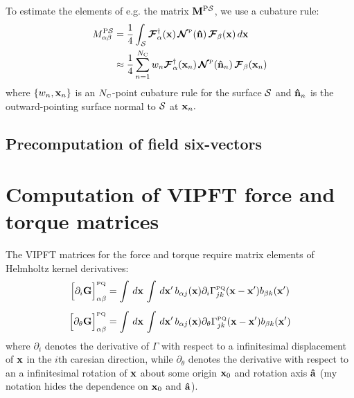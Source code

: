 \documentclass[letterpaper]{article}
\newcommand{\PS}{^{\text{\scriptsize P}\mc S}}
\begin{document}
To estimate the elements of e.g. the matrix $\vb M\PS$, we
use a cubature rule:
\begin{align}
  M_{\alpha\beta}\PS
 &= \frac{1}{4} \int_{\mc S} 
    \bmc F^\dagger_\alpha(\vb x) 
    \,
    \bmc N\supt{P}(\vbhat{n})
    \,
    \bmc F_\beta(\vb x) 
     \, d\vb x
\nn
 &\approx \frac{1}{4} \sum_{n=1}^{N\subt{C}} w_n 
    \bmc F^\dagger_\alpha(\vb x_n) 
    \,
    \bmc N\supt{P}(\vbhat{n}_n)
    \,
    \bmc F_\beta(\vb x_n) 
\label{MPSCubature}
\end{align}
where $\{w_n, \mathbf{x}_n\}$ is an $N_{\hbox{\tiny{C}}}$-point cubature rule 
for the surface $\mathcal{S}$ and $\mathbf{\hat n}_n$ is the outward-pointing
surface normal to $\mathcal{S}$ at $\mathbf{x}_n.$
 
\subsection{Precomputation of field six-vectors}

\section{Computation of VIPFT force and torque matrices}

The VIPFT matrices for the force and torque require matrix
elements of Helmholtz kernel derivatives: 
\begin{subequations}
\begin{align}
 \Big[\partial_i \mathbf{G}\Big]^{\hbox{\tiny{PQ}}}_{\alpha \beta}
&= \int\, d\mathbf{x} \, \int \, d\mathbf{x}^\prime \,
   b_{\alpha j}(\mathbf{x}) \partial_i \Gamma_{jk}^{\hbox{\tiny{PQ}}}(\mathbf{x}-\mathbf{x}^\prime)
   b_{\beta k}(\mathbf{x}^\prime)
\\[5pt]
 \Big[\partial_\theta \mathbf{G}\Big]^{\hbox{\tiny{PQ}}}_{\alpha \beta}
&= \int\, d\mathbf{x} \, \int \, d\mathbf{x}^\prime \,
   b_{\alpha j}(\mathbf{x}) 
   \partial_\theta \Gamma_{jk}^{\hbox{\tiny{PQ}}}(\mathbf{x}-\mathbf{x}^\prime)
   b_{\beta k}(\mathbf{x}^\prime)
\end{align}
\label{dGIntegrals}
\end{subequations}
where $\partial_i$ denotes the derivative of $\Gamma$ 
with respect to a infinitesimal displacement of $\mathbf{x}$
in the $i$th caresian direction, 
while $\partial_\theta$ denotes the derivative with respect to an a
infinitesimal rotation of $\mathbf{x}$ about some origin $\mathbf{x}_0$ and 
rotation axis $\mathbf{\hat a}$ (my notation hides the dependence on 
$\mathbf{x}_0$ and $\mathbf{\hat a}$).
\end{document}
